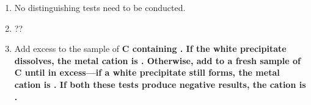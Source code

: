 \begin{enumerate}
	\item No distinguishing tests need to be conducted.
	\item ??
	\item Add excess  to the sample of \bf{C} containing . If the white precipitate dissolves, the metal cation is  .
	      Otherwise, add  to a fresh sample of \bf{C} until in excess---if a white precipitate still forms, the
	      metal cation is  . If both these tests produce negative results, the cation is .
\end{enumerate}
